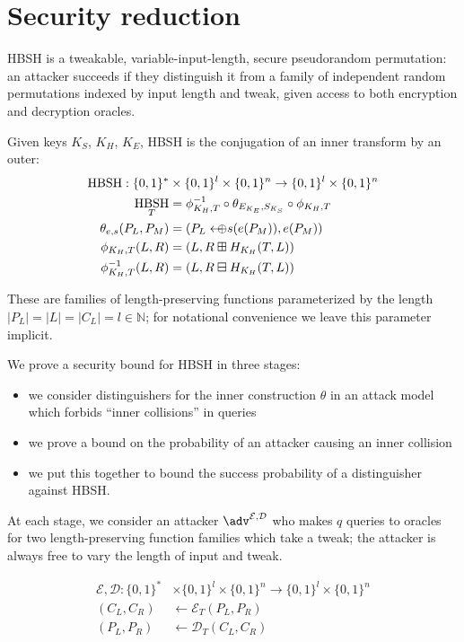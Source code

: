 \documentclass[journal=tosc,preprint,floatrow,submission]{iacrtrans}
\DeclareMathOperator{\HBSH}{HBSH}
\newcommand*{\arrowoplus}{\leftarrow\mkern-12mu\oplus}
\newcommand*{\calE}{\mathcal{E}}
\newcommand*{\calD}{\mathcal{D}}
\begin{document}
\section{Security reduction}
HBSH is a tweakable, variable-input-length, secure pseudorandom permutation: an attacker
succeeds if they distinguish it from a family of independent random permutations indexed by
input length and tweak, given access to both encryption and decryption oracles.

Given keys $K_S$, $K_H$, $K_E$, HBSH is the conjugation of an inner transform by an outer:
\begin{align*}
    \HBSH:
    \{0,1\}^* &\times \{0,1\}^l \times \{0,1\}^n \rightarrow \{0,1\}^l \times \{0,1\}^n \\
    \HBSH_{T} &= \phi^{-1}_{K_H, T}
    \circ \theta_{E_{K_E}, S_{K_S}} \circ \phi_{K_H, T} \\
    \theta_{e, s}(P_L, P_M) &= (P_L \arrowoplus s(e(P_M)), e(P_M)) \\
    \phi_{K_H, T}(L, R) &= (L, R \boxplus H_{K_H}(T, L)) \\
    \phi^{-1}_{K_H, T}(L, R) &= (L, R \boxminus H_{K_H}(T, L))
\end{align*}

These are families of length-preserving functions parameterized by the length
$|P_L| = |L| = |C_L| = l \in \mathbb{N}$;
for notational convenience we leave this parameter implicit.

We prove a security bound for HBSH in three stages:
\begin{itemize}
    \item we consider distinguishers for the inner construction $\theta$ in an
    attack model which forbids ``inner collisions'' in queries
    \item we prove a bound on the probability of an attacker causing an inner collision
    \item we put this together to bound the success probability of a distinguisher against
    HBSH.
\end{itemize}

At each stage, we consider an attacker \(\adv^{\calE, \calD}\) who makes $q$ queries
to oracles for
two length-preserving function families which take a tweak; the attacker is always free to vary
the length of input and tweak.

\begin{align*}
\calE, \calD:
\{0,1\}^* &\times \{0,1\}^l \times \{0,1\}^n \rightarrow \{0,1\}^l \times \{0,1\}^n \\
(C_L, C_R) &\leftarrow \calE_T(P_L, P_R) \\
(P_L, P_R) &\leftarrow \calD_T(C_L, C_R) \\
\end{align*}
\end{document}
